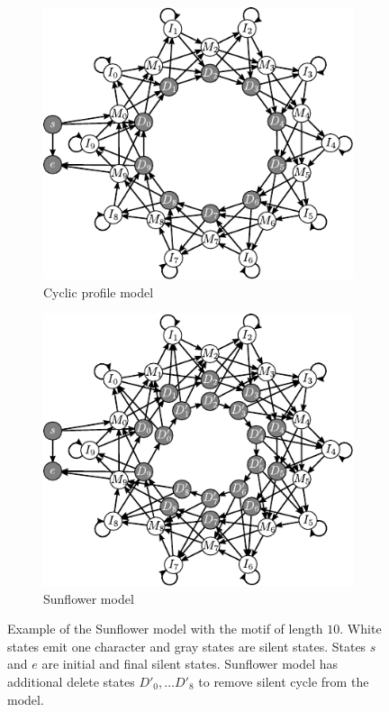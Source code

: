 \begin{figure}
\begin{center}
\begin{subfigure}[b]{0.5\textwidth}
\includegraphics{../figures/SunflowerSilentCircle.pdf}
\caption{Cyclic profile model}\label{SUBFIGURE:SUNFLOWERSILENTCYCLE}
\end{subfigure}%
\begin{subfigure}[b]{0.5\textwidth}
\includegraphics{../figures/Sunflower.pdf}
\caption{Sunflower model}\label{SUBFIGURE:SUNFLOWER}
\end{subfigure}
\end{center}
\caption[Example of the Sunflower model]{Example of the Sunflower model 
with the motif of length $10$. White states emit one character and gray states are
silent states. States $s$ and $e$ are initial and final silent states. Sunflower model
has additional delete states $D'_0, \dots D'_8$ to remove silent cycle from the
model.}
\label{FIGURE:SUNFLOWERMODEL}
\end{figure}

